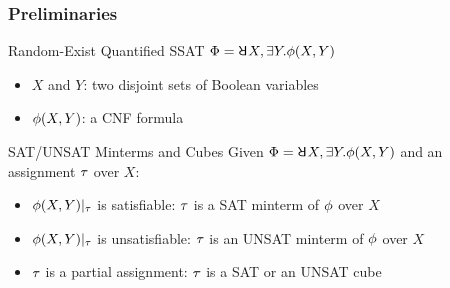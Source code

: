 \begin{frame}
    \frametitle{Preliminaries}
    \begin{block}{Random-Exist Quantified SSAT}
        $\Qf=\random{} X,\exists Y.\pf(X,Y)$
        \pause
        \begin{itemize}
            \item $X$ and $Y$: two disjoint sets of Boolean variables
                  \pause
            \item $\phi(X,Y)$: a CNF formula
                  \pause
        \end{itemize}
    \end{block}
    \begin{block}{SAT/UNSAT Minterms and Cubes}
        Given $\Qf=\random{} X,\exists Y.\pf(X,Y)$ and an assignment $\tau$ over $X$:
        \pause
        \begin{itemize}
            \item $\phi(X,Y)|_{\tau}$ is satisfiable: $\tau$ is a SAT minterm of $\phi$ over $X$
                  \pause
            \item $\phi(X,Y)|_{\tau}$ is unsatisfiable: $\tau$ is an UNSAT minterm of $\phi$ over $X$
                  \pause
            \item $\tau$ is a partial assignment: $\tau$ is a SAT or an UNSAT cube
        \end{itemize}
    \end{block}
\end{frame}

